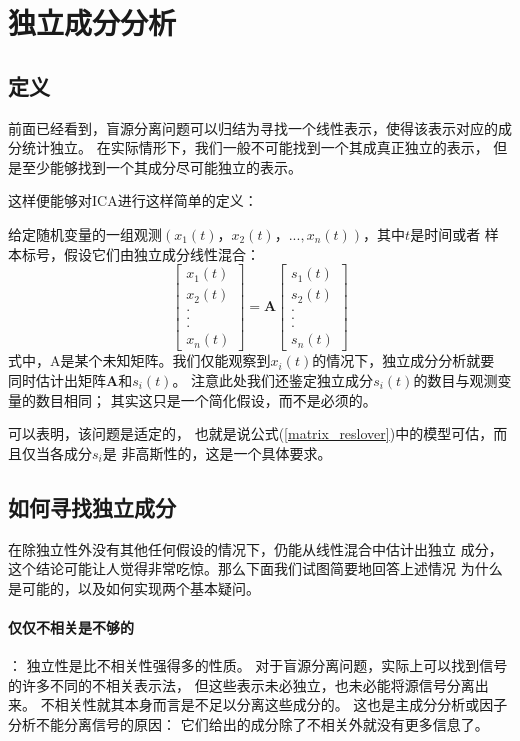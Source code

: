 \section{独立成分分析}
\subsection{定义}
前面已经看到，盲源分离问题可以归结为寻找一个线性表示，使得该表示对应的成分统计独立。
在实际情形下，我们一般不可能找到一个其成真正独立的表示，
但是至少能够找到一个其成分尽可能独立的表示。

这样便能够对ICA进行这样简单的定义：

给定随机变量的一组观测$(x_1(t)，x_2(t)，...,x_n(t))$，其中$t$是时间或者
样本标号，假设它们由独立成分线性混合：
\begin{equation} \label{matrix_reslover}
\left[ \begin{array}{c} 
x_1(t) \\
x_2(t) \\
. \\
. \\
. \\
x_n(t)
\end{array} \right]
=\bm{A}
\left[ \begin{array}{c} 
s_1(t) \\
s_2(t) \\
. \\
. \\
. \\
s_n(t)
\end{array} \right]
\end{equation}
式中，A是某个未知矩阵。我们仅能观察到$x_i(t)$的情况下，独立成分分析就要
同时估计出矩阵$\bm{A}$和$s_i(t)$。
注意此处我们还鉴定独立成分$s_i(t)$的数目与观测变量的数目相同；
其实这只是一个简化假设，而不是必须的。

可以表明，该问题是适定的，
也就是说公式(\ref{matrix_reslover})中的模型可估，而且仅当各成分$s_i$是
非高斯性的，这是一个具体要求。
    
\subsection{如何寻找独立成分}
在除独立性外没有其他任何假设的情况下，仍能从线性混合中估计出独立
成分，这个结论可能让人觉得非常吃惊。那么下面我们试图简要地回答上述情况
为什么是可能的，以及如何实现两个基本疑问。
\paragraph*{仅仅不相关是不够的}：
独立性是比不相关性强得多的性质。
对于盲源分离问题，实际上可以找到信号的许多不同的不相关表示法，
但这些表示未必独立，也未必能将源信号分离出来。
不相关性就其本身而言是不足以分离这些成分的。
这也是主成分分析或因子分析不能分离信号的原因：
它们给出的成分除了不相关外就没有更多信息了。

